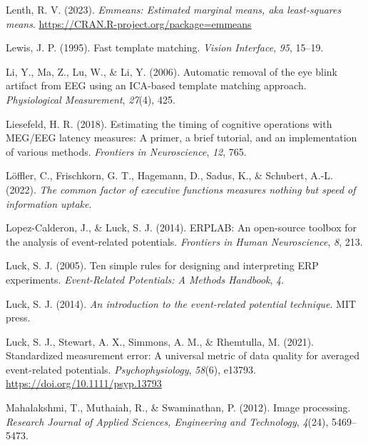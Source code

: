 \documentclass[
  man]{apa7}
\newlength{\cslhangindent}
\newlength{\cslentryspacingunit} %
\newenvironment{CSLReferences}[2] %
 {%
  \setlength{\parindent}{0pt}
  \ifodd #1
  \let\oldpar\par
  \def\par{\hangindent=\cslhangindent\oldpar}
  \fi
  \setlength{\parskip}{#2\cslentryspacingunit}
 }%
 {}
\begin{document}
\begin{CSLReferences}{1}{0}
\leavevmode{}%
Lenth, R. V. (2023). \emph{Emmeans: Estimated marginal means, aka least-squares means}. \url{https://CRAN.R-project.org/package=emmeans}

\leavevmode{}%
Lewis, J. P. (1995). Fast template matching. \emph{Vision Interface}, \emph{95}, 15--19.

\leavevmode{}%
Li, Y., Ma, Z., Lu, W., \& Li, Y. (2006). Automatic removal of the eye blink artifact from {EEG} using an {ICA}-based template matching approach. \emph{Physiological Measurement}, \emph{27}(4), 425.

\leavevmode{}%
Liesefeld, H. R. (2018). Estimating the timing of cognitive operations with {MEG}/{EEG} latency measures: A primer, a brief tutorial, and an implementation of various methods. \emph{Frontiers in Neuroscience}, \emph{12}, 765.

\leavevmode{}%
Löffler, C., Frischkorn, G. T., Hagemann, D., Sadus, K., \& Schubert, A.-L. (2022). \emph{The common factor of executive functions measures nothing but speed of information uptake}.

\leavevmode{}%
Lopez-Calderon, J., \& Luck, S. J. (2014). {ERPLAB}: An open-source toolbox for the analysis of event-related potentials. \emph{Frontiers in Human Neuroscience}, \emph{8}, 213.

\leavevmode{}%
Luck, S. J. (2005). Ten simple rules for designing and interpreting {ERP} experiments. \emph{Event-Related Potentials: A Methods Handbook}, \emph{4}.

\leavevmode{}%
Luck, S. J. (2014). \emph{An introduction to the event-related potential technique}. MIT press.

\leavevmode{}%
Luck, S. J., Stewart, A. X., Simmons, A. M., \& Rhemtulla, M. (2021). Standardized measurement error: {A} universal metric of data quality for averaged event-related potentials. \emph{Psychophysiology}, \emph{58}(6), e13793. \url{https://doi.org/10.1111/psyp.13793}

\leavevmode{}%
Mahalakshmi, T., Muthaiah, R., \& Swaminathan, P. (2012). Image processing. \emph{Research Journal of Applied Sciences, Engineering and Technology}, \emph{4}(24), 5469--5473.


\end{CSLReferences}
\end{document}
